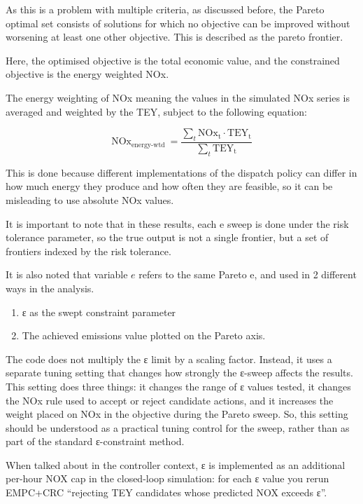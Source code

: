 \documentclass[11pt]{article}
\begin{document}
As this is a problem with multiple criteria, as discussed before, the
Pareto optimal set consists of solutions for which no objective can be
improved without worsening at least one other objective. This is
described as the pareto frontier.

Here, the optimised objective is the total economic value, and the
constrained objective is the energy weighted NOx.

The energy weighting of NOx meaning the values in the simulated NOx
series is averaged and weighted by the TEY, subject to the following
equation:

\[\text{NO}\text{x}_{\text{energy-wtd }} = \frac{\sum_{t}^{}{\text{NO}\text{x}_{\text{t}}} \cdot \text{TE}\text{Y}_{\text{t}}}{\sum_{t}^{}{\text{TE}\text{Y}_{\text{t}}}}\]

This is done because different implementations of the dispatch policy
can differ in how much energy they produce and how often they are
feasible, so it can be misleading to use absolute NOx values.

It is important to note that in these results, each e sweep is done
under the risk tolerance parameter, so the true output is not a single
frontier, but a set of frontiers indexed by the risk tolerance.

It is also noted that variable \(e\) refers to the same Pareto e, and
used in 2 different ways in the analysis.

\begin{enumerate}
\def\labelenumi{\arabic{enumi})}
\item
  ε as the swept constraint parameter
\item
  The achieved emissions value plotted on the Pareto axis.
\end{enumerate}

The code does not multiply the ε limit by a scaling factor. Instead, it
uses a separate tuning setting that changes how strongly the ε-sweep
affects the results. This setting does three things: it changes the
range of ε values tested, it changes the NOx rule used to accept or
reject candidate actions, and it increases the weight placed on NOx in
the objective during the Pareto sweep. So, this setting should be
understood as a practical tuning control for the sweep, rather than as
part of the standard ε-constraint method.

When talked about in the controller context, ε is implemented as an
additional per-hour NOX cap in the closed-loop simulation: for each ε
value you rerun EMPC+CRC ``rejecting TEY candidates whose predicted NOX
exceeds ε''.
\end{document}
